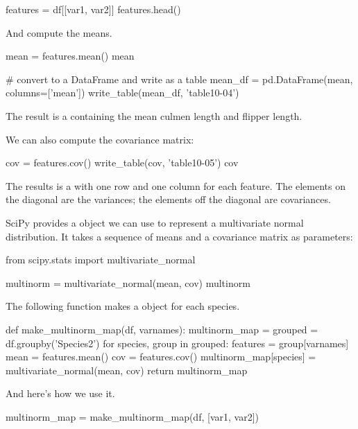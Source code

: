\documentclass[12pt]{book}
\theoremstyle{exercise}
\begin{document}
\begin{code}
features = df[[var1, var2]]
features.head()
\end{code}

And compute the means.

\begin{code}
mean = features.mean()
mean
\end{code}

\begin{code}
# convert to a DataFrame and write as a table
mean_df = pd.DataFrame(mean, columns=['mean'])
write_table(mean_df, 'table10-04')
\end{code}

The result is a  containing the mean
culmen length and flipper length.

We can also compute the covariance matrix:

\begin{code}
cov = features.cov()
write_table(cov, 'table10-05')
cov
\end{code}

The results is a  with one row and
one column for each feature. The elements on the diagonal are the
variances; the elements off the diagonal are covariances.

SciPy provides a  object
we can use to represent a multivariate normal distribution. It takes a
sequence of means and a covariance matrix as parameters:

\begin{code}
from scipy.stats import multivariate_normal

multinorm = multivariate_normal(mean, cov)
multinorm
\end{code}

The following function makes a
 object for each species.

\begin{code}
def make_multinorm_map(df, varnames):
    multinorm_map = {}
    grouped = df.groupby('Species2')
    for species, group in grouped:
        features = group[varnames]
        mean = features.mean()
        cov = features.cov()
        multinorm_map[species] = multivariate_normal(mean, cov)
    return multinorm_map
\end{code}

And here's how we use it.

\begin{code}
multinorm_map = make_multinorm_map(df, [var1, var2])
\end{code}
\end{document}
